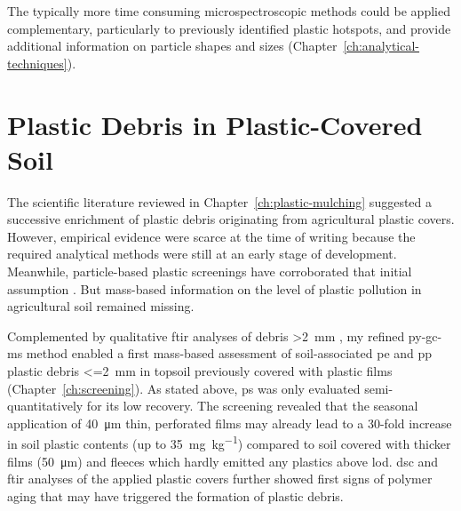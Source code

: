 The typically more time consuming microspectroscopic methods could be applied complementary, particularly to previously identified plastic hotspots, and provide additional information on particle shapes and sizes (Chapter~\ref{ch:analytical-techniques}).

\section{Plastic Debris in Plastic-Covered Soil}
\label{sec:general-discussion:screening}

The scientific literature reviewed in Chapter~\ref{ch:plastic-mulching} suggested a successive enrichment of plastic debris originating from agricultural plastic covers. However, empirical evidence were scarce at the time of writing because the required analytical methods were still at an early stage of development. Meanwhile, particle-based plastic screenings have corroborated that initial assumption \citep{HuangAgricultural2020,ZhouMicroplastics2020}. But mass-based information on the level of plastic pollution in agricultural soil remained missing.

Complemented by qualitative \ac{ftir} analyses of debris \SI{>2}{\milli\meter} \citep{CowgerMicroplastic2021}, my refined \ac{py-gc-ms} method enabled a first mass-based assessment of soil-associated \ac{pe} and \ac{pp} plastic debris \SI{<=2}{\milli\meter} in topsoil previously covered with plastic films (Chapter~\ref{ch:screening}). As stated above, \ac{ps} was only evaluated semi-quantitatively for its low recovery.
The screening revealed that the seasonal application of \SI{40}{\micro\meter} thin, perforated films may already lead to a 30-fold increase in soil plastic contents (up to \SI{35}{\milli\gram\per\kilo\gram}) compared to soil covered with thicker films (\SI{50}{\micro\meter}) and fleeces which hardly emitted any plastics above \ac{lod}. \Ac{dsc} and \ac{ftir} analyses of the applied plastic covers further showed first signs of polymer aging that may have triggered the formation of plastic debris.

